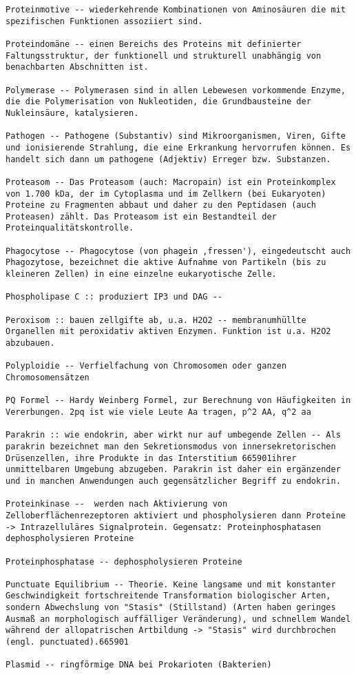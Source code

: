 \documentclass{article}
\begin{document}
\begin{verbatim}
Proteinmotive -- wiederkehrende Kombinationen von Aminosäuren die mit spezifischen Funktionen assoziiert sind.

Proteindomäne -- einen Bereichs des Proteins mit definierter Faltungsstruktur, der funktionell und strukturell unabhängig von benachbarten Abschnitten ist.

Polymerase -- Polymerasen sind in allen Lebewesen vorkommende Enzyme, die die Polymerisation von Nukleotiden, die Grundbausteine der Nukleinsäure, katalysieren.

Pathogen -- Pathogene (Substantiv) sind Mikroorganismen, Viren, Gifte und ionisierende Strahlung, die eine Erkrankung hervorrufen können. Es handelt sich dann um pathogene (Adjektiv) Erreger bzw. Substanzen.

Proteasom -- Das Proteasom (auch: Macropain) ist ein Proteinkomplex von 1.700 kDa, der im Cytoplasma und im Zellkern (bei Eukaryoten) Proteine zu Fragmenten abbaut und daher zu den Peptidasen (auch Proteasen) zählt. Das Proteasom ist ein Bestandteil der Proteinqualitätskontrolle.

Phagocytose -- Phagocytose (von phagein ‚fressen'), eingedeutscht auch Phagozytose, bezeichnet die aktive Aufnahme von Partikeln (bis zu kleineren Zellen) in eine einzelne eukaryotische Zelle.

Phospholipase C :: produziert IP3 und DAG --

Peroxisom :: bauen zellgifte ab, u.a. H2O2 -- membranumhüllte Organellen mit peroxidativ aktiven Enzymen. Funktion ist u.a. H2O2 abzubauen.

Polyploidie -- Verfielfachung von Chromosomen oder ganzen Chromosomensätzen

PQ Formel -- Hardy Weinberg Formel, zur Berechnung von Häufigkeiten in Vererbungen. 2pq ist wie viele Leute Aa tragen, p^2 AA, q^2 aa

Parakrin :: wie endokrin, aber wirkt nur auf umbegende Zellen -- Als parakrin bezeichnet man den Sekretionsmodus von innersekretorischen Drüsenzellen, ihre Produkte in das Interstitium 665901ihrer unmittelbaren Umgebung abzugeben. Parakrin ist daher ein ergänzender und in manchen Anwendungen auch gegensätzlicher Begriff zu endokrin. 

Proteinkinase --  werden nach Aktivierung von Zelloberflächenrezeptoren aktiviert und phospholysieren dann Proteine -> Intrazelluläres Signalprotein. Gegensatz: Proteinphosphatasen dephospholysieren Proteine

Proteinphosphatase -- dephospholysieren Proteine

Punctuate Equilibrium -- Theorie. Keine langsame und mit konstanter Geschwindigkeit fortschreitende Transformation biologischer Arten, sondern Abwechslung von "Stasis" (Stillstand) (Arten haben geringes Ausmaß an morphologisch auffälliger Veränderung), und schnellem Wandel während der allopatrischen Artbildung -> "Stasis" wird durchbrochen (engl. punctuated).665901

Plasmid -- ringförmige DNA bei Prokarioten (Bakterien)

\end{verbatim}
\end{document}
